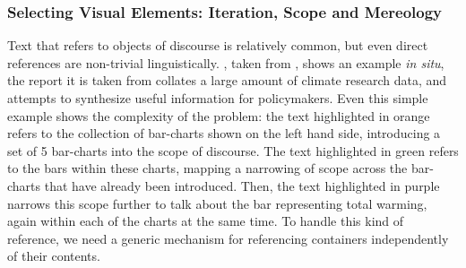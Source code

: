 \subsubsection{Selecting Visual Elements: Iteration, Scope and Mereology}
Text that refers to objects of discourse is relatively common, but even direct references are non-trivial
linguistically. , taken from \cite{lee23}, shows an example \textit{in situ}, the report
it is taken from collates a large amount of climate research data, and attempts to synthesize useful
information for policymakers. Even this simple example shows the complexity of the problem: the text
highlighted in orange refers to the collection of bar-charts shown on the left hand side, introducing a set of
5 bar-charts into the scope of discourse. The text highlighted in green refers to the bars within these
charts, mapping a narrowing of scope across the bar-charts that have already been introduced. Then, the text
highlighted in purple narrows this scope further to talk about the bar representing total warming, again
within each of the charts at the same time. To handle this kind of reference, we need a generic mechanism for
referencing containers independently of their contents.



